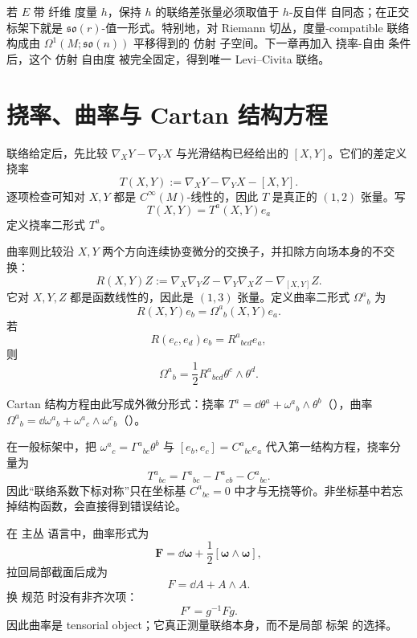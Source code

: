 若 $E$ 带 纤维 度量 $h$，保持 $h$ 的联络差张量必须取值于 $h$-反自伴 自同态；在正交标架下就是 $\mathfrak{so}(r)$-值一形式。特别地，对 Riemann 切丛，度量-compatible 联络 构成由 $\Omega^1(M;\mathfrak{so}(n))$ 平移得到的 仿射 子空间。下一章再加入 挠率-自由 条件后，这个 仿射 自由度 被完全固定，得到唯一 Levi--Civita 联络。

\section{挠率、曲率与 Cartan 结构方程}
联络给定后，先比较 $\nabla_XY-\nabla_YX$ 与光滑结构已经给出的 $[X,Y]$。它们的差定义挠率
\begin{equation*}T(X,Y)
:=\nabla_XY-\nabla_YX-[X,Y].
\end{equation*}
逐项检查可知对 $X,Y$ 都是 $C^\infty(M)$-线性的，因此 $T$ 是真正的 $(1,2)$ 张量。写
\[
T(X,Y)=T^a(X,Y)e_a
\]
定义挠率二形式 $T^a$。

曲率则比较沿 $X,Y$ 两个方向连续协变微分的交换子，并扣除方向场本身的不交换：
\begin{equation*}R(X,Y)Z
:=\nabla_X\nabla_YZ-\nabla_Y\nabla_XZ-\nabla_{[X,Y]}Z.
\end{equation*}
它对 $X,Y,Z$ 都是函数线性的，因此是 $(1,3)$ 张量。定义曲率二形式 $\Omega^a{}_b$ 为
\[
R(X,Y)e_b=\Omega^a{}_b(X,Y)e_a.
\]
若
\[
R(e_c,e_d)e_b=R^a{}_{bcd}e_a,
\]
则
\[
\Omega^a{}_b=\frac12R^a{}_{bcd}\theta^c\wedge\theta^d.
\]

Cartan 结构方程由此写成外微分形式：挠率 $T^a=\dd\theta^a+\omega^a{}_b\wedge\theta^b$（），曲率 $\Omega^a{}_b=\dd\omega^a{}_b+\omega^a{}_c\wedge\omega^c{}_b$（）。

在一般标架中，把 $\omega^a{}_c=\Gamma^a{}_{bc}\theta^b$ 与
$[e_b,e_c]=C^a{}_{bc}e_a$ 代入第一结构方程，挠率分量为
\begin{equation*}T^a{}_{bc}
=\Gamma^a{}_{bc}-\Gamma^a{}_{cb}-C^a{}_{bc}.
\end{equation*}
因此“联络系数下标对称”只在坐标基 $C^a{}_{bc}=0$ 中才与无挠等价。非坐标基中若忘掉结构函数，会直接得到错误结论。

在 主丛 语言中，曲率形式为
\begin{equation*}\mathbf F
=\dd\boldsymbol\omega
+\frac12[\boldsymbol\omega\wedge\boldsymbol\omega],\end{equation*}
拉回局部截面后成为
\begin{equation*}F=\dd A+A\wedge A.\end{equation*}
换 规范 时没有非齐次项：
\begin{equation*}F'=g^{-1}Fg.\end{equation*}
因此曲率是 tensorial object；它真正测量联络本身，而不是局部 标架 的选择。

